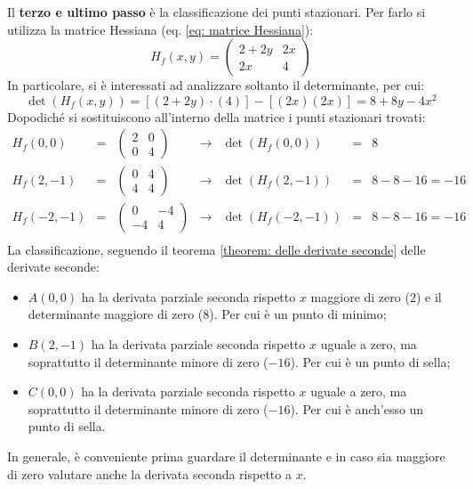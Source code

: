 \documentclass[a4paper]{article}
\begin{document}
	\noindent
	Il \textbf{terzo e ultimo passo} è la classificazione dei punti stazionari. Per farlo si utilizza la matrice Hessiana (eq. \ref{eq: matrice Hessiana}):
	\begin{equation*}
		H_{f}\left(x,y\right) = 
		\begin{pmatrix}
			2+2y 	& 2x \\
			2x		& 4
		\end{pmatrix}
	\end{equation*}
	In particolare, si è interessati ad analizzare soltanto il determinante, per cui:
	\begin{equation*}
		\det\left(H_{f}\left(x,y\right)\right) = \left[\left(2+2y\right)\cdot \left(4\right)\right] - \left[\left(2x\right)\left(2x\right)\right] = 8+8y-4x^{2}
	\end{equation*}
	Dopodiché si sostituiscono all'interno della matrice i punti stazionari trovati:
	\begin{equation*}
		\begin{array}{rclclcl}
			H_{f}\left(0,0\right) 
			&=& 
			\begin{pmatrix}
				2 & 0 \\ 0 & 4
			\end{pmatrix}
			&\rightarrow&
			\det\left(H_{f}\left(0,0\right)\right) &=& 8 \\ [1em]
			H_{f}\left(2,-1\right) 
			&=& 
			\begin{pmatrix}
				0 & 4 \\ 4 & 4
			\end{pmatrix}
			&\rightarrow&
			\det\left(H_{f}\left(2,-1\right)\right) &=& 8 - 8 - 16 = -16 \\ [1em]
			H_{f}\left(-2,-1\right) 
			&=& 
			\begin{pmatrix}
				0 & -4 \\ -4 & 4
			\end{pmatrix}
			&\rightarrow&
			\det\left(H_{f}\left(-2,-1\right)\right) &=& 8 - 8 - 16 = -16 \\ [1em]
		\end{array}
	\end{equation*}
	La classificazione, seguendo il teorema \ref{theorem: delle derivate seconde} delle derivate seconde:
	\begin{itemize}
		\item $A\left(0,0\right)$ ha la derivata parziale seconda rispetto $x$ maggiore di zero ($2$) e il determinante maggiore di zero ($8$). Per cui è un punto di minimo;

		\item $B\left(2,-1\right)$ ha la derivata parziale seconda rispetto $x$ uguale a zero, ma soprattutto il determinante minore di zero ($-16$). Per cui è un punto di sella;

		\item $C\left(0,0\right)$ ha la derivata parziale seconda rispetto $x$ uguale a zero, ma soprattutto il determinante minore di zero ($-16$). Per cui è anch'esso un punto di sella.
	\end{itemize}
	In generale, è conveniente prima guardare il determinante e in caso sia maggiore di zero valutare anche la derivata seconda rispetto a $x$.
	
\end{document}
